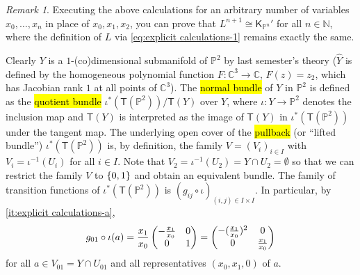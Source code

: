 \documentclass[a4paper]{amsart}
\newcommand{\N}{\mathbb{N}}
\newcommand{\C}{\mathbb{C}}
\newcommand{\TB}[1]{\mathsf{T}(#1)}
\newcommand{\KB}[1]{\mathsf{K}_{#1}}
\renewcommand{\P}{\mathbb{P}}
\theoremstyle{remark}
\newtheorem{remark}{Remark}[question]
\numberwithin{equation}{question}
\DeclarePairedDelimiter\set{\{}{\}}
\DeclarePairedDelimiter\paren{(}{)}
\begin{document}
\begin{solution}
\begin{solenum}
\begin{remark}
Executing the above calculations for an arbitrary number of variables $x_0,\dots,x_n$ in place of $x_0,x_1,x_2$, you can prove that $L^{n+1} \cong \KB{\P^n}'$ for all $n \in \N$, where the definition of $L$ via \cref{eq:explicit calculations-1} remains exactly the same.
\end{remark}

\item Clearly $Y$ is a $1$-(co)dimensional submanifold of $\P^2$ by last semester's theory ($\hat Y$ is defined by the homogeneous polynomial function $F \colon \C^3 \to \C$, $F(z) = z_2$, which has Jacobian rank $1$ at all points of $\C^3$). The \hl{normal bundle} of $Y$ in $\P^2$ is defined as the \hl{quotient bundle} $\iota^*(\TB{\P^2})/\TB Y$ over $Y$, where $\iota \colon Y \to \P^2$ denotes the inclusion map and $\TB Y$ is interpreted as the image of $\TB Y$ in $\iota^*(\TB{\P^2})$ under the tangent map. The underlying open cover of the \hl{pullback} (or “lifted bundle”) $\iota^*(\TB{\P^2})$ is, by definition, the family $V = (V_i)_{i \in I}$ with $V_i = \iota^{-1}(U_i)$ for all $i \in I$. Note that $V_2 = \iota^{-1}(U_2) = Y \cap U_2 = \emptyset$ so that we can restrict the family $V$ to $\set{0,1}$ and obtain an equivalent bundle. The family of transition functions of $\iota^*(\TB{\P^2})$ is $(g_{ij} \circ \iota)_{(i,j) \in I \times I}$.  In particular, by \cref{it:explicit calculations-a},
\begin{equation}
\label{eq:explicit calculations-2}
g_{01} \circ \iota(a) = \frac{x_1}{x_0} \begin{pmatrix}-\frac{x_1}{x_0} & 0 \\ 0 & 1\end{pmatrix} = \begin{pmatrix}-\paren{\frac{x_1}{x_0}}^2 & 0 \\ 0 & \frac{x_1}{x_0}\end{pmatrix}
\end{equation}
for all $a \in V_{01} = Y \cap U_{01}$ and all representatives $(x_0,x_1,0)$ of $a$.


\end{solenum}
\end{solution}
\end{document}
